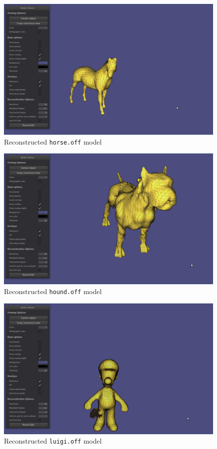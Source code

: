 \documentclass[11pt]{article}
\begin{document}
\begin{figure}[h]
\includegraphics[scale=0.3]{horse_reconstructed.png}
\caption{Reconstructed \texttt{horse.off} model}
\end{figure}

\begin{figure}[h]
\includegraphics[scale=0.3]{hound_reconstructed.png}
\caption{Reconstructed \texttt{hound.off} model}
\end{figure}

\begin{figure}[h]
\includegraphics[scale=0.3]{luigi_reconstructed.png}
\caption{Reconstructed \texttt{luigi.off} model}
\end{figure}
\end{document}
